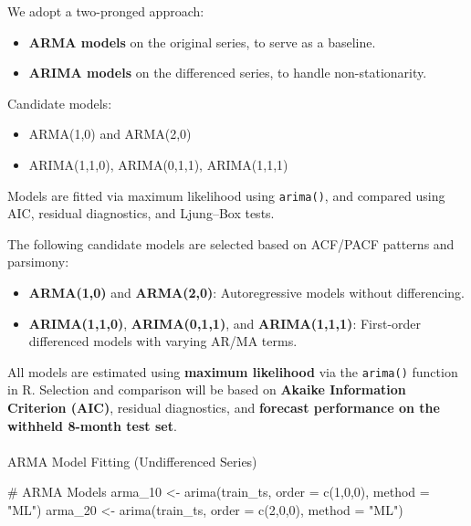 \documentclass[
  11pt,
]{article}
\makeatletter
\let\oldparagraph\paragraph
\renewcommand{\paragraph}{
    \@ifstar
      \xxxParagraphStar
      \xxxParagraphNoStar
  }
\newcommand{\xxxParagraphStar}[1]{\oldparagraph*{#1}\mbox{}}
\newcommand{\xxxParagraphNoStar}[1]{\oldparagraph{#1}\mbox{}}
\newenvironment{Shaded}{\begin{snugshade}}{\end{snugshade}}
\newcommand{\AttributeTok}[1]{\textcolor[rgb]{0.40,0.45,0.13}{#1}}
\newcommand{\CommentTok}[1]{\textcolor[rgb]{0.37,0.37,0.37}{#1}}
\newcommand{\DecValTok}[1]{\textcolor[rgb]{0.68,0.00,0.00}{#1}}
\newcommand{\FunctionTok}[1]{\textcolor[rgb]{0.28,0.35,0.67}{#1}}
\newcommand{\NormalTok}[1]{\textcolor[rgb]{0.00,0.23,0.31}{#1}}
\newcommand{\OtherTok}[1]{\textcolor[rgb]{0.00,0.23,0.31}{#1}}
\newcommand{\StringTok}[1]{\textcolor[rgb]{0.13,0.47,0.30}{#1}}
\makeatother
\begin{document}
We adopt a two-pronged approach:

\begin{itemize}
\item
  \textbf{ARMA models} on the original series, to serve as a baseline.
\item
  \textbf{ARIMA models} on the differenced series, to handle
  non-stationarity.
\end{itemize}

Candidate models:

\begin{itemize}
\item
  ARMA(1,0) and ARMA(2,0)
\item
  ARIMA(1,1,0), ARIMA(0,1,1), ARIMA(1,1,1)
\end{itemize}

Models are fitted via maximum likelihood using \texttt{arima()}, and
compared using AIC, residual diagnostics, and Ljung--Box tests.

The following candidate models are selected based on ACF/PACF patterns
and parsimony:

\begin{itemize}
\item
  \textbf{ARMA(1,0)} and \textbf{ARMA(2,0)}: Autoregressive models
  without differencing.
\item
  \textbf{ARIMA(1,1,0)}, \textbf{ARIMA(0,1,1)}, and
  \textbf{ARIMA(1,1,1)}: First-order differenced models with varying
  AR/MA terms.
\end{itemize}

All models are estimated using \textbf{maximum likelihood} via the
\texttt{arima()} function in R. Selection and comparison will be based
on \textbf{Akaike Information Criterion (AIC)}, residual diagnostics,
and \textbf{forecast performance on the withheld 8-month test set}.

\paragraph{ARMA Model Fitting (Undifferenced
Series)}\label{arma-model-fitting-undifferenced-series}

\begin{Shaded}
\begin{Highlighting}[]
\CommentTok{\# ARMA Models}
\NormalTok{arma\_10 }\OtherTok{\textless{}{-}} \FunctionTok{arima}\NormalTok{(train\_ts, }\AttributeTok{order =} \FunctionTok{c}\NormalTok{(}\DecValTok{1}\NormalTok{,}\DecValTok{0}\NormalTok{,}\DecValTok{0}\NormalTok{), }\AttributeTok{method =} \StringTok{"ML"}\NormalTok{)}
\NormalTok{arma\_20 }\OtherTok{\textless{}{-}} \FunctionTok{arima}\NormalTok{(train\_ts, }\AttributeTok{order =} \FunctionTok{c}\NormalTok{(}\DecValTok{2}\NormalTok{,}\DecValTok{0}\NormalTok{,}\DecValTok{0}\NormalTok{), }\AttributeTok{method =} \StringTok{"ML"}\NormalTok{)}
\end{Highlighting}
\end{Shaded}
\end{document}
